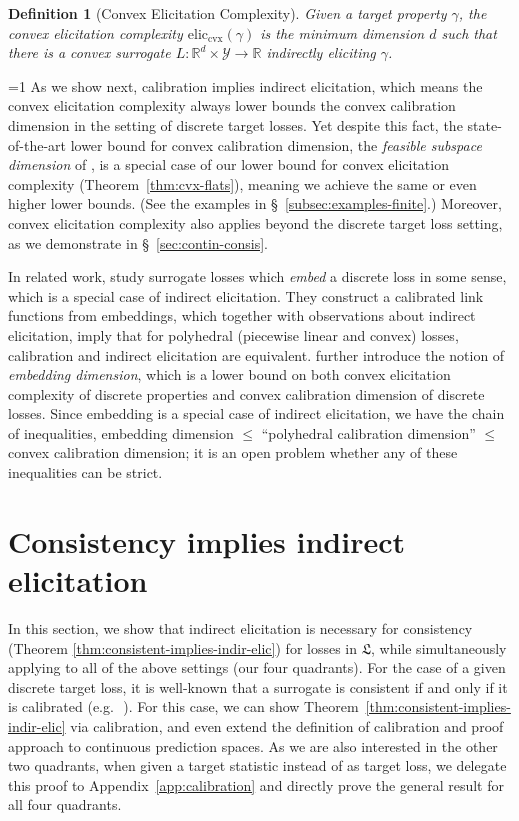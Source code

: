 \documentclass{article}
\newcommand{\Comments}{1}
\newcommand{\mytodo}[2]{\ifnum\Comments=1%
	\todo[linecolor=#1!80!black,backgroundcolor=#1,bordercolor=#1!80!black]{#2}\fi}
\newcommand{\btw}[1]{\mytodo{gray!10!white}{\textcolor{gray}{BTW: #1}}}%
\newcommand{\reals}{\mathbb{R}}
\newcommand{\eliccvx}{\mathrm{elic}_\mathrm{cvx}}
\renewcommand{\L}{\mathfrak{L}}
\newcommand{\Y}{\mathcal{Y}}
\newtheorem{definition}{Definition}
\begin{document}
\begin{definition}[Convex Elicitation Complexity]
	Given a target property $\gamma$, the \emph{convex elicitation complexity} $\eliccvx(\gamma)$ is the minimum dimension $d$ such that there is a convex surrogate \mbox{$L : \reals^d \times \Y \to \reals$} indirectly eliciting $\gamma$.
\end{definition}

\btw{cut this? but still want to answer the question of ``how does elicitation relate to calibration?''}
As we show next, calibration implies indirect elicitation, which means the convex elicitation complexity always lower bounds the convex calibration dimension in the setting of discrete target losses.
Yet despite this fact, the state-of-the-art lower bound for convex calibration dimension, the \emph{feasible subspace dimension} of \citet{ramaswamy2016convex}, is a special case of our lower bound for convex elicitation complexity (Theorem~\ref{thm:cvx-flats}), meaning we achieve the same or even higher lower bounds.
(See the examples in \S~\ref{subsec:examples-finite}.)
Moreover, convex elicitation complexity also applies beyond the discrete target loss setting, as we demonstrate in \S~\ref{sec:contin-consis}.

In related work,
\citet{finocchiaro2019embedding} study surrogate losses which \emph{embed} a discrete loss in some sense, which is a special case of indirect elicitation.
They construct a calibrated link functions from embeddings, which together with observations about indirect elicitation, imply that for polyhedral (piecewise linear and convex) losses, calibration and indirect elicitation are equivalent.
\citet{finocchiaro2020embedding} further introduce the notion of \emph{embedding dimension}, which is a lower bound on both convex elicitation complexity of discrete properties and convex calibration dimension of discrete losses.
Since embedding is a special case of indirect elicitation, we have the chain of inequalities, embedding dimension $\leq$  ``polyhedral calibration dimension'' $\leq$ convex calibration dimension; it is an open problem whether any of these inequalities can be strict.


\section{Consistency implies indirect elicitation}\label{sec:consis-implies-indir}

In this section, we show that indirect elicitation is necessary for consistency (Theorem \ref{thm:consistent-implies-indir-elic}) for losses in $\L$, while simultaneously applying to all of the above settings (our four quadrants).
For the case of a given discrete target loss, it is well-known that a surrogate is consistent if and only if it is calibrated (e.g.\,~\citep[Theorem 1, part 3]{bartlett2006convexity}).
For this case, we can show Theorem~\ref{thm:consistent-implies-indir-elic} via calibration, and even extend the definition of calibration and proof approach to continuous prediction spaces.
As we are also interested in the other two quadrants, when given a target statistic instead of as target loss,
we delegate this proof to Appendix~\ref{app:calibration} and directly prove the general result for all four quadrants.
\end{document}
